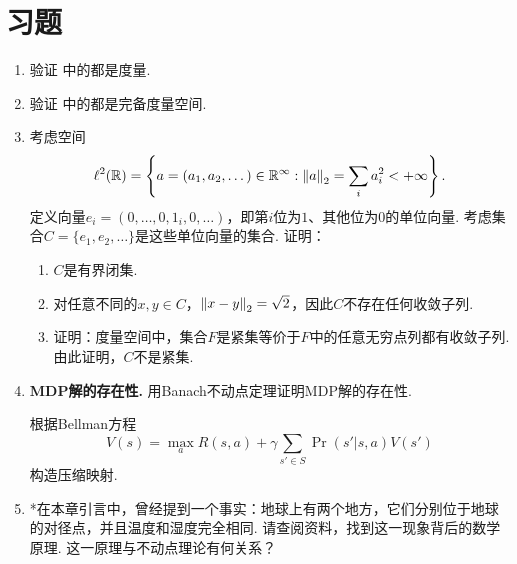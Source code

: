 \section{习题}

\begin{enumerate}[wide, labelindent=0pt]
    \item \label{exercise:metric} 验证 中的都是度量. 
    \item \label{exercise:complete-metric-space} 验证 中的都是完备度量空间. 
    \item \label{exercise:compact-not-bounded-closed} 考虑空间
    \[\ell^2(\mathbb{R})=\left\{a=(a_1,a_2,\dots)\in\mathbb{R}^{\infty}:\left\|a\right\|_2=\sum_{i}a_i^2<+\infty\right\}.\]
    定义向量$e_i=(0,\dots,0,1_i,0,\dots)$，即第$i$位为$1$、其他位为$0$的单位向量. 考虑集合$C=\{e_1,e_2,\dots\}$是这些单位向量的集合. 证明：
    \begin{enumerate}
        \item $C$是有界闭集. 
        \item 对任意不同的$x,y\in C$，$\left\|x-y\right\|_2=\sqrt{2}$，因此$C$不存在任何收敛子列. 
        \item 证明：度量空间中，集合$F$是紧集等价于$F$中的任意无穷点列都有收敛子列. 由此证明，$C$不是紧集. 
    \end{enumerate}

    \item \textbf{MDP解的存在性.} 用Banach不动点定理证明MDP解的存在性.
    \begin{hint}
    根据Bellman方程
    \[
    V(s) = \max_a R(s, a) + \gamma \sum_{s' \in S} \Pr(s' | s, a) V(s')
    \]
    构造压缩映射.
    \end{hint}

    \item *在本章引言中，曾经提到一个事实：地球上有两个地方，它们分别位于地球的对径点，并且温度和湿度完全相同. 请查阅资料，找到这一现象背后的数学原理. 这一原理与不动点理论有何关系？

\end{enumerate}

